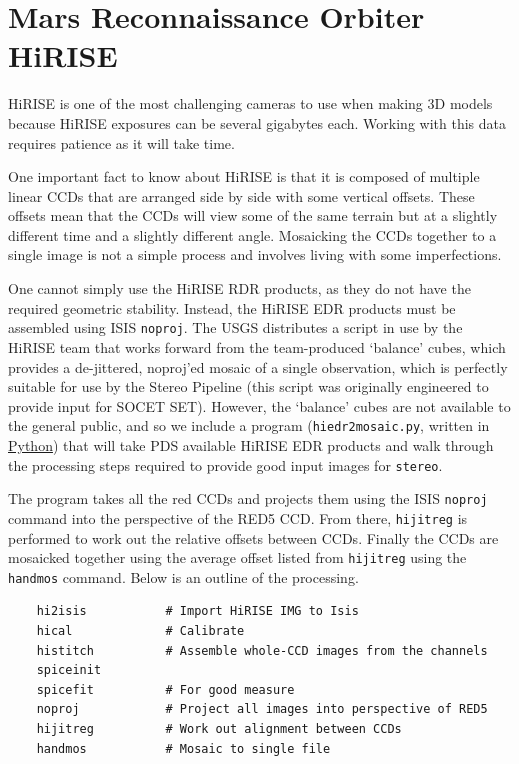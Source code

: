 \section{Mars Reconnaissance Orbiter HiRISE}

\ac{HiRISE} is one of the most challenging cameras to use when making 3D
models because \ac{HiRISE} exposures can be several gigabytes each. Working
with this data requires patience as it will take time.

One important fact to know about HiRISE is that it is composed of
multiple linear CCDs that are arranged side by side with some vertical
offsets. These offsets mean that the CCDs will view some of the same
terrain but at a slightly different time and a slightly different
angle. Mosaicking the CCDs together to a single image is not a simple
process and involves living with some imperfections.

One cannot simply use the \ac{HiRISE} RDR products, as they do not
have the required geometric stability.  Instead, the \ac{HiRISE}
EDR products must be assembled using \ac{ISIS} \texttt{noproj}.
The USGS distributes a script in use by the \ac{HiRISE} team that
works forward from the team-produced `balance' cubes, which provides
a de-jittered, noproj'ed mosaic of a single observation, which is
perfectly suitable for use by the Stereo Pipeline (this script was
originally engineered to provide input for SOCET SET).  However,
the `balance' cubes are not available to the general public, and
so we include a program (\texttt{hiedr2mosaic.py}, written in
\href{http://www.python.org}{Python}) that will take \ac{PDS}
available \ac{HiRISE} EDR products and walk through the processing
steps required to provide good input images for \texttt{stereo}.

The program takes all the red CCDs and projects them using the \ac{ISIS}
{\tt noproj} command into the perspective of the RED5 CCD. From there,
{\tt hijitreg} is performed to work out the relative offsets between
CCDs. Finally the CCDs are mosaicked together using the average
offset listed from {\tt hijitreg} using the {\tt handmos} command.
Below is an outline of the processing.

\begin{verbatim}
    hi2isis           # Import HiRISE IMG to Isis
    hical             # Calibrate
    histitch          # Assemble whole-CCD images from the channels
    spiceinit
    spicefit          # For good measure
    noproj            # Project all images into perspective of RED5
    hijitreg          # Work out alignment between CCDs
    handmos           # Mosaic to single file
\end{verbatim}

